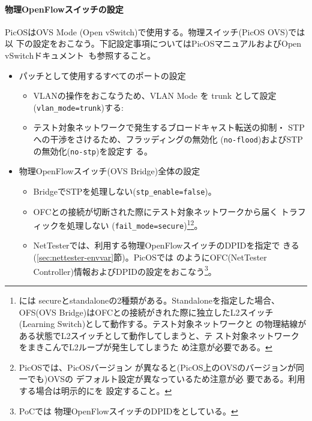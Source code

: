     \paragraph{物理OpenFlowスイッチの設定}
PicOSはOVS Mode (Open vSwitch)で使用する。物理スイッチ(PicOS OVS)では以
下の設定をおこなう。下記設定事項についてはPicOSマニュアルおよびOpen
vSwitchドキュメント~\cite{ovs-vswitchd-doc}も参照すること。
\begin{itemize}
 \item パッチとして使用するすべてのポートの設定~\cite{l1pjtech}
       \begin{itemize}
        \item VLANの操作をおこなうため、VLAN Mode を trunk として設定
              (\verb|vlan_mode=trunk|)する:
        \item テスト対象ネットワークで発生するブロードキャスト転送の抑制・
              STPへの干渉をさけるため、フラッディングの無効化
              (\verb|no-flood|)およびSTPの無効化(\verb|no-stp|)を設定す
              る。
       \end{itemize}
 \item 物理OpenFlowスイッチ(OVS Bridge)全体の設定
       \begin{itemize}
        \item BridgeでSTPを処理しない(\verb|stp_enable=false|)。
        \item OFCとの接続が切断された際にテスト対象ネットワークから届く
              トラフィックを処理しない
              (\verb|fail_mode=secure|)\footnote{には
              secureとstandaloneの2種類がある。Standaloneを指定した場合、
              OFS(OVS Bridge)はOFCとの接続がきれた際に独立したL2スイッチ
              (Learning Switch)として動作する。テスト対象ネットワークと
              の物理結線がある状態でL2スイッチとして動作してしまうと、テ
              スト対象ネットワークをまきこんでL2ループが発生してしまうた
              め注意が必要である。}\footnote{PicOSでは、PicOSバージョン
              が異なると(PicOS上のOVSのバージョンが同一でも)OVSの
              デフォルト設定が異なっているため注意が必
              要である。利用する場合は明示的にを
              設定すること。}。
        \item NetTesterでは、利用する物理OpenFlowスイッチのDPIDを指定で
              きる(\ref{sec:nettester-envvar}節)。PicOSでは
              のようにOFC(NetTester
              Controller)情報およびDPIDの設定をおこなう\footnote{PoCでは
              物理OpenFlowスイッチのDPIDをとしている。}。

\end{itemize}
\end{itemize}

